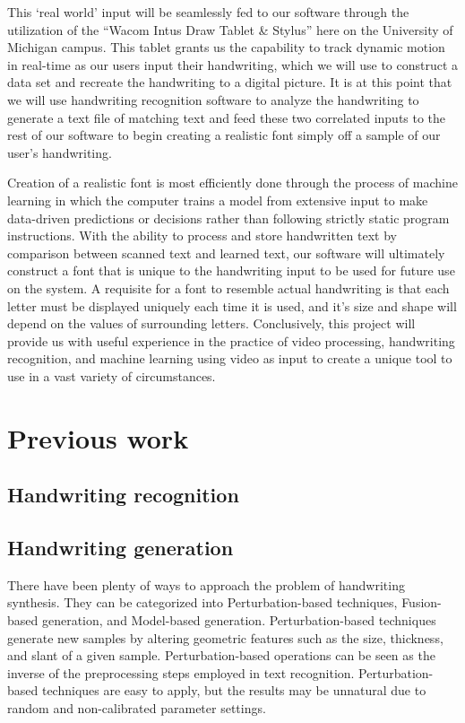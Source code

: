 \documentclass{article} %
\begin{document}
This ‘real world’ input will be seamlessly fed to our software through the utilization of the “Wacom Intus Draw Tablet \& Stylus” here on the University of Michigan campus. This tablet grants us the capability to track dynamic motion in real-time as our users input their handwriting, which we will use to construct a data set and recreate the handwriting to a digital picture. It is at this point that we will use handwriting recognition software to analyze the handwriting to generate a text file of matching text and feed these two correlated inputs to the rest of our software to begin creating a realistic font simply off a sample of our user’s handwriting. 

Creation of a realistic font is most efficiently done through the process of machine learning in which the computer trains a model from extensive input to make data-driven predictions or decisions rather than following strictly static program instructions. With the ability to process and store handwritten text by comparison between scanned text and learned text, our software will ultimately construct a font that is unique to the handwriting input to be used for future use on the system. A requisite for a font to resemble actual handwriting is that each letter must be displayed uniquely each time it is used, and it’s size and shape will depend on the values of surrounding letters. Conclusively, this project will provide us with useful experience in the practice of video processing, handwriting recognition, and machine learning using video as input to create a unique tool to use in a vast variety of circumstances.
	
\section{Previous work}
\subsection{Handwriting recognition} %
\subsection{Handwriting generation} %
There have been plenty of ways to approach the problem of handwriting synthesis. They can be categorized into Perturbation-based techniques, Fusion-based generation, and Model-based generation. 
Perturbation-based techniques generate new samples by
altering geometric features such as the size, thickness, and
slant of a given sample. Perturbation-based operations can
be seen as the inverse of the preprocessing steps employed
in text recognition. Perturbation-based techniques are easy
to apply, but the results may be unnatural due to random and
non-calibrated parameter settings. 
\end{document}
